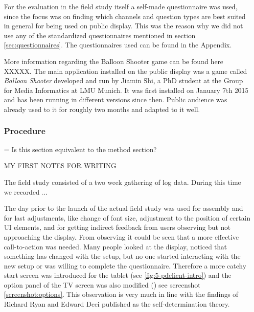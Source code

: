 

		For the evaluation in the field study itself a self-made questionnaire was used, since the focus was on finding which channels and question types are best suited in general for being used on public display. This was the reason why we did not use any of the standardized questionnaires mentioned in section \ref{sec:questionnaires}. The questionnaires used can be found in the Appendix.



		More information regarding the Balloon Shooter game can be found here XXXXX. 
		The main application installed on the public display was a game called \textit{Balloon Shooter} developed and run by Jiamin Shi, a PhD student at the Group for Media Informatics at LMU Munich. It was first installed on January 7th 2015 and has been running in different versions since then. Public audience was already used to it for roughly two months and adapted to it well.





	\subsubsection{Procedure}
		= Is this section equivalent to the method section?

		MY FIRST NOTES FOR WRITING

		The field study consisted of a two week gathering of log data. During this time we recorded ...


		The day prior to the launch of the actual field study was used for assembly and for last adjustments, like change of font size, adjustment to the position of certain UI elements, and for getting indirect feedback from users observing but not approaching the display.
		From observing it could be seen that a more effective call-to-action was needed. Many people looked at the display, noticed that something has changed with the setup, but no one started interacting with the new setup or was willing to complete the questionnaire. Therefore a more catchy start screen was introduced for the tablet (see \ref{fig:5-pdclient-intro}) and the option panel of the TV screen was also modified () see screenshot \ref{screenshot:options}. 
		This observation is very much in line with the findings of Richard Ryan and Edward Deci published as the self-determination theory\cite{ryan2000self}.


